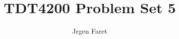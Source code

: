 \documentclass[11pt]{report}
\begin{document}
\title{TDT4200 Problem Set 5}
\author{Jrgen Faret}
\date{}
\maketitle
\end{document}
